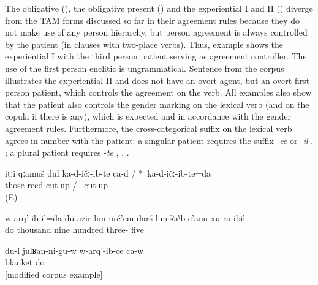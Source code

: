 The obligative (), the obligative present () and the experiential I and II () diverge from the TAM forms discussed so far in their agreement rules because they do not make use of any person hierarchy, but person agreement is always controlled by the patient (in clauses with two-place verbs). Thus, example  shows the experiential I with the third person patient serving as agreement controller. The use of the first person enclitic is ungrammatical. Sentence  from the corpus illustrates the experiential II and does not have an overt agent, but an overt first person patient, which controls the agreement on the verb. All examples also show that the patient also controls the gender marking on the lexical verb (and on the copula if there is any), which is expected and in accordance with the gender agreement rules. Furthermore, the cross-categorical suffix on the lexical verb agrees in number with the patient: a singular patient requires the suffix -\textit{ce}  or -\textit{il} , ; a plural patient requires -\textit{te} , , .


%
\begin{exe}
	\ex	\label{ex:I cut those reeds1}
	\gll	itːi	qːamuš		dul		ka-d-ičː-ib-te	ca-d	/	{*}~ka-d-ičː-ib-te=da\\
		those	reed			cut.up			/	{\hphantom{*}}~cut.up\\
	\glt	{} (E)
	
		\ex	\label{ex:‎‎‎I was born in 1935 analytic2}
	\gll	w-arq'-ib-il=da	du	azir-lim	urč'em	darš-lim	ʡaˁb-c'anu	xu-ra-ibil\\
		do		thousand	nine	hundred	three-	five\\
	\glt	{}
	
		\ex	\label{ex:‎I gave birth to (my son) under a blanket@A}
		\gll	du-l	julʁan-ni-gu-w	w-arq'-ib-ce	ca-w\\
				blanket	do 	\\
		\glt	{} [modified corpus example]

\end{exe}


